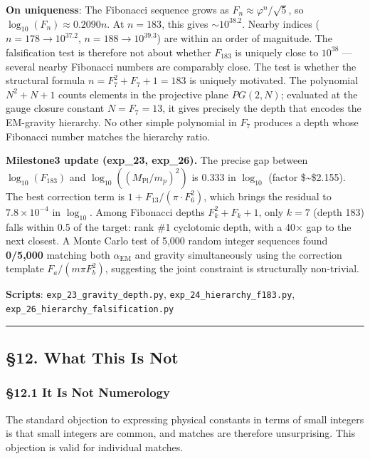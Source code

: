 \documentclass[
  11pt,
  a4paper]{article}
\begin{document}
\textbf{On uniqueness}: The Fibonacci sequence grows as
\(F_n \approx \varphi^n/\sqrt{5}\), so
\(\log_{10}(F_n) \approx 0.2090n\). At \(n = 183\), this gives
\(\sim 10^{38.2}\). Nearby indices (\(n = 178 \to 10^{37.2}\),
\(n = 188 \to 10^{39.3}\)) are within an order of magnitude. The
falsification test is therefore not about whether \(F_{183}\) is
uniquely close to \(10^{38}\) --- several nearby Fibonacci numbers are
comparably close. The test is whether the structural formula
\(n = F_7^2 + F_7 + 1 = 183\) is uniquely motivated. The polynomial
\(N^2 + N + 1\) counts elements in the projective plane \(PG(2, N)\);
evaluated at the gauge closure constant \(N = F_7 = 13\), it gives
precisely the depth that encodes the EM-gravity hierarchy. No other
simple polynomial in \(F_7\) produces a depth whose Fibonacci number
matches the hierarchy ratio.

\textbf{Milestone3 update (exp\_23, exp\_26).} The precise gap between
\(\log_{10}(F_{183})\) and \(\log_{10}((M_{\mathrm{Pl}}/m_p)^2)\) is
0.333 in \(\log_{10}\) (factor \$\sim\$2.155). The best correction term
is \(1 + F_{13}/(\pi \cdot F_6^2)\), which brings the residual to
\(7.8 \times 10^{-4}\) in \(\log_{10}\). Among Fibonacci depths
\(F_k^2 + F_k + 1\), only \(k = 7\) (depth 183) falls within 0.5 of the
target: rank \#1 cyclotomic depth, with a 40× gap to the next closest. A
Monte Carlo test of 5,000 random integer sequences found
\textbf{0/5,000} matching both \(\alpha_{\mathrm{EM}}\) and gravity
simultaneously using the correction template \(F_a/(m\pi F_b^2)\),
suggesting the joint constraint is structurally non-trivial.

\textbf{Scripts}: \texttt{exp\_23\_gravity\_depth.py},
\texttt{exp\_24\_hierarchy\_f183.py},
\texttt{exp\_26\_hierarchy\_falsification.py}

\begin{center}\rule{0.5\linewidth}{0.5pt}\end{center}

\subsection{§12. What This Is Not}\label{what-this-is-not}

\subsubsection{§12.1 It Is Not Numerology}\label{it-is-not-numerology}

The standard objection to expressing physical constants in terms of
small integers is that small integers are common, and matches are
therefore unsurprising. This objection is valid for individual matches.
\end{document}
